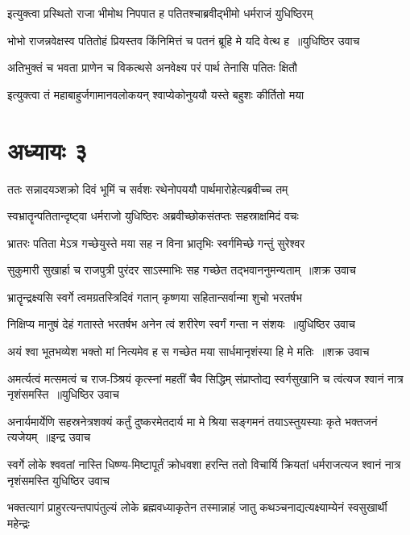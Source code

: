 \twolineshloka
{इत्युक्त्वा प्रस्थितो राजा भीमोथ निपपात ह}
{पतितश्चाब्रवीद्भीमो धर्मराजं युधिष्ठिरम्}


\threelineshloka
{भोभो राजन्नवेक्षस्व पतितोहं प्रियस्तव}
{किंनिमित्तं च पतनं ब्रूहि मे यदि वेत्थ ह ॥युधिष्ठिर उवाच}
{}


\twolineshloka
{अतिभुक्तं च भवता प्राणेन च विकत्थसे}
{अनवेक्ष्य परं पार्थ तेनासि पतितः क्षितौ}


\twolineshloka
{इत्युक्त्वा तं महाबाहुर्जगामानवलोकयन्}
{श्वाप्येकोनुययौ यस्ते बहुशः कीर्तितो मया}


\chapter{अध्यायः ३}
\twolineshloka
{ततः सन्नादयञ्शक्रो दिवं भूमिं च सर्वशः}
{रथेनोपययौ पार्थमारोहेत्यब्रवीच्च तम्}


\twolineshloka
{स्वभ्रातॄन्पतितान्दृष्ट्वा धर्मराजो युधिष्ठिरः}
{अब्रवीच्छोकसंतप्तः सहस्राक्षमिदं वचः}


\twolineshloka
{भ्रातरः पतिता मेऽत्र गच्छेयुस्ते मया सह}
{न विना भ्रातृभिः स्वर्गमिच्छे गन्तुं सुरेश्वर}


\threelineshloka
{सुकुमारी सुखार्हा च राजपुत्री पुरंदर}
{साऽस्माभिः सह गच्छेत तद्भवाननुमन्यताम् ॥शक्र उवाच}
{}


\twolineshloka
{भ्रातॄन्द्रक्ष्यसि स्वर्गे त्वमग्रतस्त्रिदिवं गतान्}
{कृष्णया सहितान्सर्वान्मा शुचो भरतर्षभ}


\threelineshloka
{निक्षिप्य मानुषं देहं गतास्ते भरतर्षभ}
{अनेन त्वं शरीरेण स्वर्गं गन्ता न संशयः ॥युधिष्ठिर उवाच}
{}


\threelineshloka
{अयं श्वा भूतभव्येश भक्तो मां नित्यमेव ह}
{स गच्छेत मया सार्धमानृशंस्या हि मे मतिः ॥शक्र उवाच}
{}


\threelineshloka
{अमर्त्यत्वं मत्समत्वं च राज-ञ्श्रियं कृत्स्नां महतीं चैव सिद्धिम्}
{संप्राप्तोद्य स्वर्गसुखानि च त्वंत्यज श्वानं नात्र नृशंसमस्ति ॥युधिष्ठिर उवाच}
{}


\threelineshloka
{अनार्यमार्येणि सहस्रनेत्रशक्यं कर्तुं दुष्करमेतदार्य}
{मा मे श्रिया सङ्गमनं तयाऽस्तुयस्याः कृते भक्तजनं त्यजेयम् ॥इन्द्र उवाच}
{}


\fourlineindentedshloka
{स्वर्गे लोके श्ववतां नास्ति धिष्ण्य-मिष्टापूर्तं क्रोधवशा हरन्ति}
{ततो विचार्यि क्रियतां धर्मराजत्यज श्वानं नात्र नृशंसमस्ति}
{युधिष्ठिर उवाच}
{}


\twolineshloka
{भक्तत्यागं प्राहुरत्यन्तपापंतुल्यं लोके ब्रह्मवध्याकृतेन}
{तस्मान्नाहं जातु कथञ्चनाद्यत्यक्ष्याम्येनं स्वसुखार्थी महेन्द्रः}


